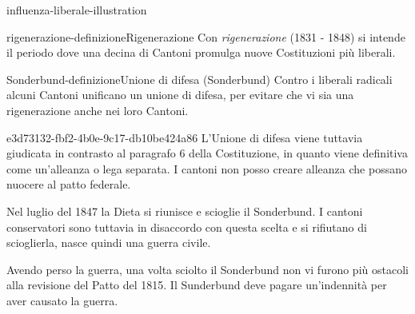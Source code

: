 \documentclass[preview]{standalone}
\begin{document}
\begin{snippet}{influenza-liberale-illustration}
    \begin{center}
    \end{center}
\end{snippet}

\begin{snippetdefinition}{rigenerazione-definizione}{Rigenerazione}
    Con \textit{rigenerazione} (1831 - 1848) si intende il periodo dove una decina di Cantoni promulga nuove Costituzioni più liberali.
\end{snippetdefinition}

\begin{snippetdefinition}{Sonderbund-definizione}{Unione di difesa (Sonderbund)}
    Contro i liberali radicali alcuni Cantoni unificano un unione di difesa,
    per evitare che vi sia una rigenerazione anche nei loro Cantoni.
\end{snippetdefinition}

\begin{snippet}{e3d73132-fbf2-4b0e-9c17-db10be424a86}
    L'Unione di difesa viene tuttavia giudicata in contrasto al paragrafo 6 della Costituzione, in quanto
    viene definitiva come un'alleanza o lega separata.
    I cantoni non posso creare alleanza che possano nuocere al patto federale.
    
    Nel luglio del 1847 la Dieta si riunisce e scioglie il Sonderbund.
    I cantoni conservatori sono tuttavia in disaccordo con questa scelta e si rifiutano di scioglierla,
    nasce quindi una guerra civile.
    
    Avendo perso la guerra, una volta sciolto il Sonderbund non vi furono più ostacoli alla revisione del Patto del 1815.
    Il Sunderbund deve pagare un'indennità per aver causato la guerra.
\end{snippet}
\end{document}
